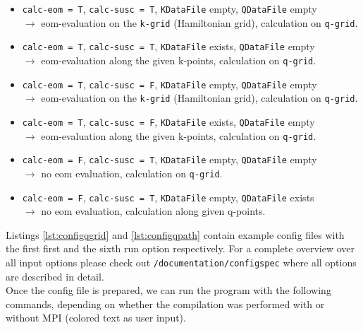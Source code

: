 \documentclass[a4paper,11pt]{article}
\numberwithin{equation}{section} %
\begin{document}
\begin{itemize}
\item {\color{ForestGreen}\verb+calc-eom = T+}, {\color{ForestGreen}\verb+calc-susc = T+}, {\color{red}\verb+KDataFile+ empty}, {\color{red}\verb+QDataFile+ empty}
\\ $\rightarrow$ eom-evaluation on the \verb+k-grid+ (Hamiltonian grid), calculation on \verb+q-grid+.
\item {\color{ForestGreen}\verb+calc-eom = T+}, {\color{ForestGreen}\verb+calc-susc = T+}, {\color{ForestGreen}\verb+KDataFile+ exists}, {\color{red}\verb+QDataFile+ empty}
\\ $\rightarrow$ eom-evaluation along the given k-points, calculation on \verb+q-grid+.
\item {\color{ForestGreen}\verb+calc-eom = T+}, {\color{red}\verb+calc-susc = F+}, {\color{red}\verb+KDataFile+ empty}, {\color{red}\verb+QDataFile+ empty}
\\ $\rightarrow$ eom-evaluation on the \verb+k-grid+ (Hamiltonian grid), calculation on \verb+q-grid+.
\item {\color{ForestGreen}\verb+calc-eom = T+}, {\color{red}\verb+calc-susc = F+}, {\color{ForestGreen}\verb+KDataFile+ exists}, {\color{red}\verb+QDataFile+ empty}
\\ $\rightarrow$ eom-evaluation along the given k-points, calculation on \verb+q-grid+.
\item {\color{red}\verb+calc-eom = F+}, {\color{ForestGreen}\verb+calc-susc = T+}, {\color{red}\verb+KDataFile+ empty}, {\color{red}\verb+QDataFile+ empty}
\\ $\rightarrow$ no eom evaluation, calculation on \verb+q-grid+.
\item {\color{red}\verb+calc-eom = F+}, {\color{ForestGreen}\verb+calc-susc = T+}, {\color{red}\verb+KDataFile+ empty}, {\color{ForestGreen}\verb+QDataFile+ exists}
\\ $\rightarrow$ no eom evaluation, calculation along given q-points.


\end{itemize}

Listings \ref{lst:configqgrid} and \ref{lst:configqpath} contain example config files with the first first and the sixth run option respectively.
For a complete overview over all input options please check out
{\color{blue}\verb|/documentation/configspec|} where all options are described in detail.
\\[\baselineskip]
Once the config file is prepared, we can run the program with the following commands, depending on whether the compilation was performed with or without MPI (colored text as user input).
\end{document}

